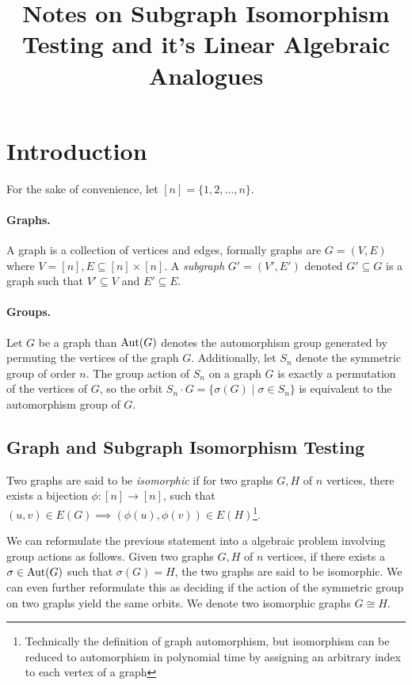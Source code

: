 \documentclass[12pt]{article}
\title{
    Notes on Subgraph Isomorphism Testing and it's Linear Algebraic Analogues
}
\author{}
\date{}
\begin{document}
\maketitle

\section{Introduction}

For the sake of convenience, let $[n] = \{ 1, 2, \ldots, n \}$.

\paragraph{Graphs.} A graph is a collection of vertices and edges, formally graphs are $G=(V, E)$ where $V=[n],E\subseteq [n]{\times}[n]$. A \textit{subgraph} $G'=(V',E')$ denoted $G'\subseteq G$ is a graph such that $V' \subseteq V$ and $E'\subseteq E$.

\paragraph{Groups.} Let $G$ be a graph than $\mathrm{Aut}(G)$ denotes the automorphism group generated by permuting the vertices of the graph $G$. Additionally, let $S_{n}$ denote the symmetric group of order $n$. The group action of $S_{n}$ on a graph $G$ is exactly a permutation of the vertices of $G$, so the orbit $S_{n}\cdot G = \{ \sigma(G) \mid \sigma \in S_{n} \}$ is equivalent to the automorphism group of $G$.

\subsection{Graph and Subgraph Isomorphism Testing}

Two graphs are said to be \textit{isomorphic} if for two graphs $G, H$ of $n$ vertices, there exists a bijection $\phi : [n] \to [n]$, such that $(u,v)\in E(G) \implies (\phi(u),\phi(v)) \in E(H)$\footnote{Technically the definition of graph automorphism, but isomorphism can be reduced to automorphism in polynomial time by assigning an arbitrary index to each vertex of a graph}.

We can reformulate the previous statement into a algebraic problem involving group actions as follows. Given two graphs $G,H$ of $n$ vertices, if there exists a $\sigma\in \mathrm{Aut}(G)$ such that $\sigma(G)=H$, the two graphs are said to be isomorphic. We can even further reformulate this as deciding if the action of the symmetric group on two graphs yield the same orbits. We denote two isomorphic graphs $G\cong H$.
\end{document}
